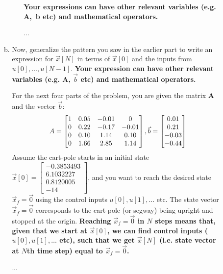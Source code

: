 \documentclass[11pt]{article}
\def\A{\textbf{A}} %
\begin{document}
\begin{enumerate}
\begin{enumerate}
\begin{enumerate}[(a)]
\begin{enumerate}[i.]
                    \textbf{Your expressions can have other relevant variables (e.g. A,~b etc) and mathematical operators.}
                    \begin{Answer}
	      	            ...
	      	        \end{Answer}
	      	    \end{enumerate}
	      	    
	      	    
	      	    \newpage
	      	    
	      	    \item Now, generalize the pattern you saw in the earlier part to write an expression for $\vec x[N]$ in terms of $\vec x[0]$ and the inputs from $u[0],\ldots ,u[N - 1]$. \textbf{Your expression can have other relevant variables (e.g. $\A$, $\vec b$ etc) and mathematical operators.}
	      	    
	      	    For the next four parts of the problem, you are given the matrix $\A$ and the vector $\vec b$: 
	      	    \[
	      	    A = \begin{bmatrix}
                    1 & 0.05 & -0.01 & 0 \\
                    0 & 0.22 & -0.17 & -0.01 \\
                    0 & 0.10 & 1.14 & 0.10 \\
                    0 & 1.66 & 2.85 & 1.14
	      	    \end{bmatrix}, \\  \vec b = \begin{bmatrix}
                                            0.01 \\
                                            0.21 \\
                                            -0.03 \\
                                            -0.44	      	    
	      	                            \end{bmatrix}
	      	    \]
	      	    Assume the cart-pole starts in an initial state $\vec x[0] = \begin{bmatrix}
	      	        -0.3853493 \\
                    6.1032227 \\
                    0.8120005 \\
                    -14
	      	    \end{bmatrix}$, and you want to reach the desired state $\vec x_f = \vec 0$ using the control inputs $u[0],u[1],\ldots$ etc. The state vector $\vec x_f =\vec 0$ corresponds to the cart-pole (or segway) being upright and stopped at the origin. \textbf{Reaching $\vec x_f =\vec 0$ in $N$ steps means that, given that we start at $\vec x[0]$, we can find control inputs ($u[0],u[1],\ldots$ etc), such that we get $\vec x[N]$ (i.e. state vector at $N$th time step) equal to $\vec x_f =\vec 0$.}
                    \begin{Answer}
	      	            ...
	      	        \end{Answer}
	      	    

\end{enumerate}
\end{enumerate}
\end{enumerate}
\end{document}
